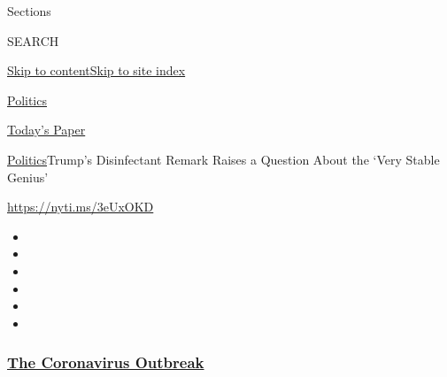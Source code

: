 Sections

SEARCH

\protect\hyperlink{site-content}{Skip to
content}\protect\hyperlink{site-index}{Skip to site index}

\href{https://www.nytimes3xbfgragh.onion/section/politics}{Politics}

\href{https://myaccount.nytimes3xbfgragh.onion/auth/login?response_type=cookie\&client_id=vi}{}

\href{https://www.nytimes3xbfgragh.onion/section/todayspaper}{Today's
Paper}

\href{/section/politics}{Politics}\textbar{}Trump's Disinfectant Remark
Raises a Question About the `Very Stable Genius'

\url{https://nyti.ms/3eUxOKD}

\begin{itemize}
\item
\item
\item
\item
\item
\item
\end{itemize}

\hypertarget{the-coronavirus-outbreak}{%
\subsubsection{\texorpdfstring{\href{https://www.nytimes3xbfgragh.onion/news-event/coronavirus?name=styln-coronavirus-national\&region=TOP_BANNER\&block=storyline_menu_recirc\&action=click\&pgtype=Article\&impression_id=04cd4590-f292-11ea-8c52-a90ab0322ff1\&variant=undefined}{The
Coronavirus
Outbreak}}{The Coronavirus Outbreak}}\label{the-coronavirus-outbreak}}

